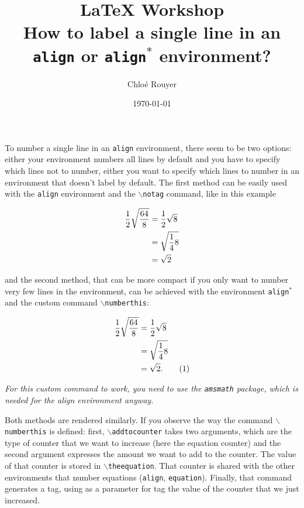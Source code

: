 \documentclass{article}
\author{Chloé Rouyer}
\title{\LARGE{\LaTeX{} Workshop}\\
	\large{How to label a single line in an \texttt{align} or \texttt{align$^*$} environment?}
}
\date{\today}
\newcommand\numberthis{\addtocounter{equation}{1}\tag{\theequation}}
\begin{document}
	
	\maketitle

	To number a single line in an \texttt{align} environment, there seem to be two options: either your environment numbers all lines by default and you have to specify which lines not to number, either you want to specify which lines to number in an environment that doesn't label by default. The first method can be easily used with the \texttt{align} environment and the \texttt{$\backslash$notag} command, like in this example
	

	\begin{align}
	\frac{1}{2}\sqrt{\frac{64}{8}}  
	& = 	\frac{1}{2}\sqrt{8}   \notag\\
	& = 	\sqrt{\frac{1}{4}8} \notag\\
	&  = \sqrt{2} \label{eq:align}
	\end{align}
	
	and the second method, that can be more compact if you only want to number very few lines in the environment, can be achieved with the environment \texttt{align$^*$} and the custom command \texttt{$\backslash$numberthis}:

	\begin{align*}
	\frac{1}{2}\sqrt{\frac{64}{8}}  
	& = 	\frac{1}{2}\sqrt{8}  \\
	& = 	\sqrt{\frac{1}{4}8} \\
	&  = \sqrt{2}. \label{eq:align_star} \numberthis
	\end{align*}
	
	\textit{For this custom command to work, you need to use the \texttt{amsmath} package, which is needed for the align environment anyway.}
	
	Both methods are rendered similarly. 
	If you observe the way the command \texttt{$\backslash$numberthis} is defined: first, \texttt{$\backslash$addtocounter} takes two arguments, which are the type of counter that we want to increase (here the equation counter) and the second argument expresses the amount we want to add to the counter. The value of that counter is stored in \texttt{$\backslash$theequation}. That counter is shared with the other environments that number equations (\texttt{align}, \texttt{equation}). Finally, that command generates a tag, using as a parameter for tag the value of the counter that we just increased.
\end{document}
